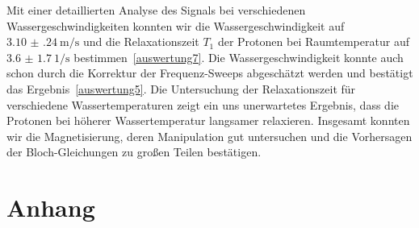 \documentclass[paper=a4,
	fontsize=10pt,
	DIV=18,
	twocolumn,
	parskip=half
	]{scrartcl}
\numberwithin{equation}{section}    %
\begin{document}
Mit einer detaillierten Analyse des Signals bei verschiedenen Wassergeschwindigkeiten konnten wir die Wassergeschwindigkeit auf $\SI[per-mode=symbol]{3.10(24)}{\meter\per\second}$ und die Relaxationszeit $T_1$ der Protonen bei Raumtemperatur auf $\SI{3.6(17)}{1\per\second}$ bestimmen~\ref{auswertung7}. Die Wassergeschwindigkeit konnte auch schon durch die Korrektur der Frequenz-Sweeps abgeschätzt werden und bestätigt das Ergebnis~\ref{auswertung5}. Die Untersuchung der Relaxationszeit für verschiedene Wassertemperaturen zeigt ein uns unerwartetes Ergebnis, dass die Protonen bei höherer Wassertemperatur langsamer relaxieren. Insgesamt konnten wir die Magnetisierung, deren Manipulation gut untersuchen und die Vorhersagen der Bloch-Gleichungen zu großen Teilen bestätigen. 
%
%
%
%

\small

\nocite{*}

\normalsize


\onecolumn
\pagestyle{empty}
% 

\section{Anhang}
\label{Anhang}
\end{document}
